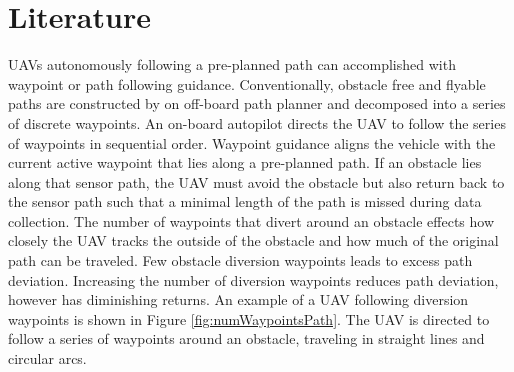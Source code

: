 \documentclass[conf]{new-aiaa}
\begin{document}
%

\section{Literature}
UAVs autonomously following a pre-planned path can accomplished with waypoint or path following guidance. Conventionally, obstacle free and flyable paths are constructed by on off-board path planner and decomposed into a series of discrete waypoints. An on-board autopilot directs the UAV to follow the series of waypoints in sequential order. Waypoint guidance aligns the vehicle with the current active waypoint that lies along a pre-planned path. If an obstacle lies along that sensor path, the UAV must avoid the obstacle but also return back to the sensor path such that a minimal length of the path is missed during data collection. The number of waypoints that divert around an obstacle effects how closely the UAV tracks the outside of the obstacle and how much of the original path can be traveled. Few obstacle diversion waypoints leads to excess path deviation. Increasing the number of diversion waypoints reduces path deviation, however has diminishing returns. An example of a UAV following diversion waypoints is shown in Figure \ref{fig:numWaypointsPath}. The UAV is directed to follow a series of waypoints around an obstacle, traveling in straight lines and circular arcs.



%
\end{document}
